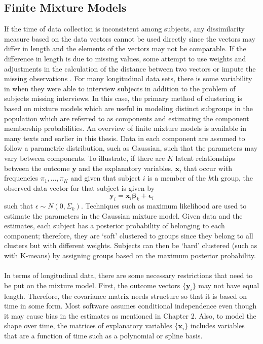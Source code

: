 \documentclass[12pt]{article}
\newcommand{\B}[0]{\mathbf}
\newcommand{\bs}[0]{\boldsymbol}
\begin{document}
\subsection{Finite Mixture Models}
If the time of data collection is inconsistent among subjects, any dissimilarity measure based on the data vectors cannot be used directly since the vectors may differ in length and the elements of the vectors may not be comparable. If the difference in length is due to missing values, some attempt to use weights and adjustments in the calculation of the distance between two vectors or impute the missing observations \cite{genolini2010}. For many longitudinal data sets, there is some variability in when they were able to interview subjects in addition to the problem of subjects missing interviews. In this case, the primary method of clustering is based on mixture models which are useful in modeling distinct subgroups in the population which are referred to as components and estimating the component membership probabilities. An overview of finite mixture models is available in many texts \cite{everitt1981,mclachlan1988,mclachlan2000} and earlier in this thesis. Data in each component are assumed to follow a parametric distribution, such as Gaussian, such that the parameters may vary between components. To illustrate, if there are $K$ latent relationships between the outcome $\B y$ and the explanatory variables, $\B x$, that occur with frequencies $\pi_{1},...,\pi_{K}$ and given that subject $i$ is a member of the $k$th group, the observed data vector for that subject is given by
$$\B y_{i} = \B x_{i}\bs\beta_{k}+\bs\epsilon_{i}$$
such that $\epsilon \sim N(0,\Sigma_{k})$. Techniques such as maximum likelihood are used to estimate the parameters in the Gaussian mixture model. Given data and the estimates, each subject has a posterior probability of belonging to each component; therefore, they are `soft' clustered to groups since they belong to all clusters but with different weights. Subjects can then be `hard' clustered (such as with K-means) by assigning groups based on the maximum posterior probability. \\\\
In terms of longitudinal data, there are some necessary restrictions that need to be put on the mixture model. First, the outcome vectors $\{\B y_{i}\}$ may not have equal length. Therefore, the covariance matrix needs structure so that it is based on time in some form. Most software assumes conditional independence even though it may cause bias in the estimates as mentioned in Chapter 2. Also, to model the shape over time, the matrices of explanatory variables $\{\B x_{i}\}$ includes variables that are a function of time such as a polynomial or spline basis. \\\\
\end{document}

